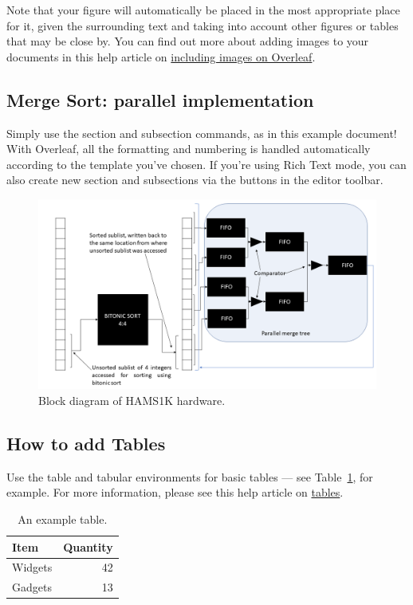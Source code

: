 \documentclass{article}
\begin{document}
Note that your figure will automatically be placed in the most appropriate place for it, given the surrounding text and taking into account other figures or tables that may be close by. You can find out more about adding images to your documents in this help article on \href{https://www.overleaf.com/learn/how-to/Including_images_on_Overleaf}{including images on Overleaf}.


\subsection{Merge Sort: parallel implementation}

Simply use the section and subsection commands, as in this example document! With Overleaf, all the formatting and numbering is handled automatically according to the template you've chosen. If you're using Rich Text mode, you can also create new section and subsections via the buttons in the editor toolbar.


\begin{figure}
\centering
\includegraphics[width=1.00\textwidth]{hams_scheme.png}
\caption{\label{fig:scheme}Block diagram of HAMS1K hardware.}
\end{figure}


\subsection{How to add Tables}

Use the table and tabular environments for basic tables --- see Table~\ref{tab:widgets}, for example. For more information, please see this help article on \href{https://www.overleaf.com/learn/latex/tables}{tables}. 

\begin{table}
\centering
\begin{tabular}{l|r}
Item & Quantity \\\hline
Widgets & 42 \\
Gadgets & 13
\end{tabular}
\caption{\label{tab:widgets}An example table.}
\end{table}
\end{document}
